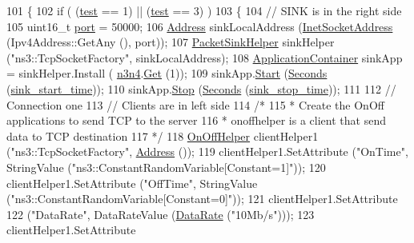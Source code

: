 \begin{DoxyCode}
101 \{
102   \textcolor{keywordflow}{if} ( (\hyperlink{main-test-sync_8cc_a708a4c1a4d0c4acc4c447310dd4db27f}{test} == 1) || (\hyperlink{main-test-sync_8cc_a708a4c1a4d0c4acc4c447310dd4db27f}{test} == 3) )
103     \{
104       \textcolor{comment}{// SINK is in the right side}
105       uint16\_t \hyperlink{dsdv-manet_8cc_a8e0798404bf2cf5dabb84c5ba9a4f236}{port} = 50000;
106       \hyperlink{classns3_1_1Address}{Address} sinkLocalAddress (\hyperlink{classns3_1_1InetSocketAddress}{InetSocketAddress} (Ipv4Address::GetAny (), port));
107       \hyperlink{classns3_1_1PacketSinkHelper}{PacketSinkHelper} sinkHelper (\textcolor{stringliteral}{"ns3::TcpSocketFactory"}, sinkLocalAddress);
108       \hyperlink{classns3_1_1ApplicationContainer}{ApplicationContainer} sinkApp = sinkHelper.Install (
      \hyperlink{red-tests_8cc_a71269c713841141f40860e991d435588}{n3n4}.\hyperlink{classns3_1_1NodeContainer_a9ed96e2ecc22e0f5a3d4842eb9bf90bf}{Get} (1));
109       sinkApp.\hyperlink{classns3_1_1ApplicationContainer_a8eff87926507020bbe3e1390358a54a7}{Start} (\hyperlink{group__timecivil_ga33c34b816f8ff6628e33d5c8e9713b9e}{Seconds} (\hyperlink{red-tests_8cc_a2c56dc9b543a4442a7edd8d680c4a1bc}{sink\_start\_time}));
110       sinkApp.\hyperlink{classns3_1_1ApplicationContainer_adfc52f9aa4020c8714679b00bbb9ddb3}{Stop} (\hyperlink{group__timecivil_ga33c34b816f8ff6628e33d5c8e9713b9e}{Seconds} (\hyperlink{red-tests_8cc_a2462eef540f5b896f14d4ea7b7bb6214}{sink\_stop\_time}));
111 
112       \textcolor{comment}{// Connection one}
113       \textcolor{comment}{// Clients are in left side}
114       \textcolor{comment}{/*}
115 \textcolor{comment}{       * Create the OnOff applications to send TCP to the server}
116 \textcolor{comment}{       * onoffhelper is a client that send data to TCP destination}
117 \textcolor{comment}{       */}
118       \hyperlink{classns3_1_1OnOffHelper}{OnOffHelper} clientHelper1 (\textcolor{stringliteral}{"ns3::TcpSocketFactory"}, \hyperlink{classns3_1_1Address}{Address} ());
119       clientHelper1.SetAttribute (\textcolor{stringliteral}{"OnTime"}, StringValue (\textcolor{stringliteral}{"ns3::ConstantRandomVariable[Constant=1]"}));
120       clientHelper1.SetAttribute (\textcolor{stringliteral}{"OffTime"}, StringValue (\textcolor{stringliteral}{"ns3::ConstantRandomVariable[Constant=0]"}));
121       clientHelper1.SetAttribute 
122         (\textcolor{stringliteral}{"DataRate"}, DataRateValue (\hyperlink{classns3_1_1DataRate}{DataRate} (\textcolor{stringliteral}{"10Mb/s"})));
123       clientHelper1.SetAttribute 

\end{DoxyCode}
